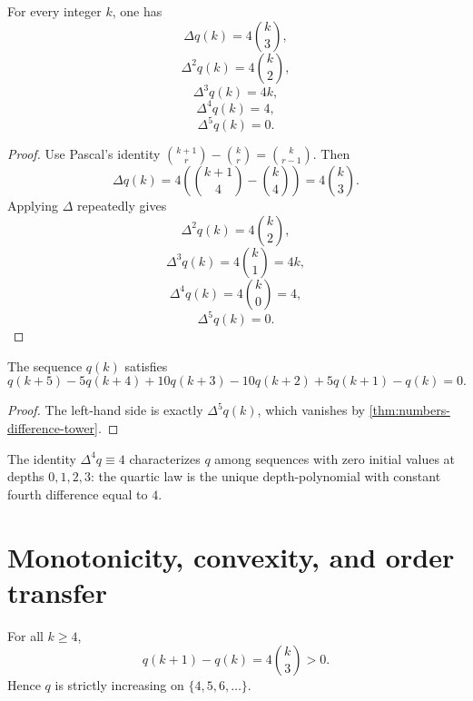 \begin{theorem}
\label{thm:numbers-difference-tower}
For every integer \(k\), one has
\[
  \Delta q(k)=4\binom{k}{3},
\]
\[
  \Delta^2 q(k)=4\binom{k}{2},
\]
\[
  \Delta^3 q(k)=4k,
\]
\[
  \Delta^4 q(k)=4,
\]
\[
  \Delta^5 q(k)=0.
\]
\end{theorem}

\begin{proof}
Use Pascal's identity
\(
  \binom{k+1}{r}-\binom{k}{r}=\binom{k}{r-1}
\).
Then
\[
  \Delta q(k)
  =4\left(\binom{k+1}{4}-\binom{k}{4}\right)
  =4\binom{k}{3}.
\]
Applying \(\Delta\) repeatedly gives
\[
  \Delta^2 q(k)=4\binom{k}{2},
\]
\[
  \Delta^3 q(k)=4\binom{k}{1}=4k,
\]
\[
  \Delta^4 q(k)=4\binom{k}{0}=4,
\]
\[
  \Delta^5 q(k)=0.
\]
\end{proof}

\begin{corollary}
\label{cor:numbers-order5-recurrence}
The sequence \(q(k)\) satisfies
\[
  q(k+5)-5q(k+4)+10q(k+3)-10q(k+2)+5q(k+1)-q(k)=0.
\]
\end{corollary}

\begin{proof}
The left-hand side is exactly \(\Delta^5 q(k)\), which vanishes by
\cref{thm:numbers-difference-tower}.
\end{proof}

\begin{remark}
\label{rem:numbers-rigidity-delta4}
The identity \(\Delta^4 q\equiv4\) characterizes \(q\) among sequences with
zero initial values at depths \(0,1,2,3\):
the quartic law is the unique depth-polynomial with constant fourth
difference equal to \(4\).
\end{remark}

\section{Monotonicity, convexity, and order transfer}
\label{sec:numbers-order-transfer}

\begin{proposition}
\label{prop:numbers-strict-growth}
For all \(k\ge4\),
\[
  q(k+1)-q(k)=4\binom{k}{3}>0.
\]
Hence \(q\) is strictly increasing on \(\{4,5,6,\dots\}\).
\end{proposition}


